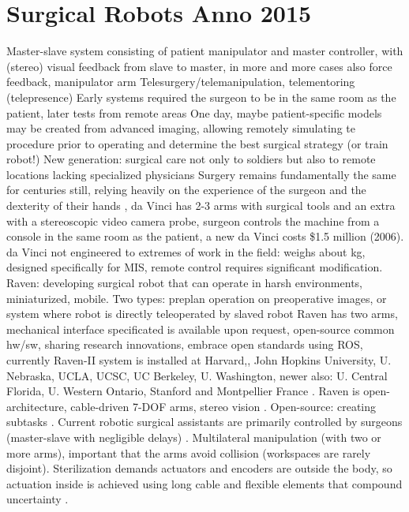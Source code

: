 \section{Surgical Robots Anno 2015}
Master-slave system consisting of patient manipulator and master controller, with (stereo) visual feedback from slave to master, in more and more cases also force feedback, manipulator arm
Telesurgery/telemanipulation, telementoring (telepresence)
Early systems required the surgeon to be in the same room as the patient, later tests from remote areas
One day, maybe patient-specific models may be created from advanced imaging, allowing  remotely simulating te procedure prior to operating and determine the best surgical strategy (or train robot!)
New generation: surgical care not only to soldiers but also to remote locations lacking specialized physicians
Surgery remains fundamentally the same for centuries still, relying heavily on the experience of the surgeon and the dexterity of their hands \citep{bib:docatadist},
da Vinci has 2-3 arms with surgical tools and an extra with a stereoscopic video camera probe, surgeon controls the machine from a console in the same room as the patient, a new da Vinci costs \$1.5 million (2006).
da Vinci not engineered to extremes of work in the field: weighs about  kg, designed specifically for MIS, remote control requires significant modification.
Raven: developing surgical robot that can operate in harsh environments, miniaturized, mobile.
Two types: preplan operation on preoperative images, or system where robot is directly teleoperated by slaved robot
Raven has two arms, mechanical interface specificated is available upon request, open-source common hw/sw, sharing research innovations, embrace open standards \citep{bib:raven_ii} using ROS, currently Raven-II system is installed at Harvard,, John Hopkins University, U. Nebraska, UCLA, UCSC, UC Berkeley, U. Washington, newer also: U. Central Florida, U. Western Ontario, Stanford and Montpellier France \citep{bib:raven_ii}.
Raven is open-architecture, cable-driven 7-DOF arms, stereo vision \citep{bib:raven_debride}.
Open-source: creating subtasks \citep{bib:raven_debride}.
Current robotic surgical assistants are primarily controlled by surgeons (master-slave with negligible delays) \citep{bib:raven_debride}.
Multilateral manipulation (with two or more arms), important that the arms avoid collision \citep{bib:raven_debride} (workspaces are rarely disjoint).
Sterilization demands actuators and encoders are outside the body, so actuation inside is achieved using long cable and flexible elements that compound uncertainty \citep{bib:raven_debride}.
